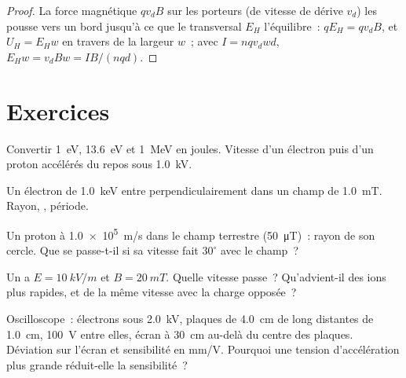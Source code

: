 \begin{proof}
La force magnétique $qv_dB$ sur les porteurs (de vitesse de dérive
$v_d$) les pousse vers un bord jusqu'à ce que le 
transversal $E_H$ l'équilibre~: $qE_H = qv_dB$, et $U_H = E_Hw$ en
travers de la largeur $w$~; avec $I = nqv_dwd$, $E_Hw = v_dBw = IB/(nqd)$.
\end{proof}

\section{Exercices}

\begin{exercise}[$\star$]\label{exo:b1:charged-particles:1}
Convertir \qty{1}{eV}, \qty{13.6}{eV} et \qty{1}{MeV} en joules. Vitesse
d'un électron puis d'un proton accélérés du repos sous \qty{1.0}{kV}.
\end{exercise}

\begin{exercise}[$\star$]\label{exo:b1:charged-particles:2}
Un électron de \qty{1.0}{keV} entre perpendiculairement dans un champ de
\qty{1.0}{mT}. Rayon, , période.
\end{exercise}

\begin{exercise}[$\star$]\label{exo:b1:charged-particles:3}
Un proton à \qty{1.0e5}{m/s} dans le champ terrestre (\qty{50}{\micro T})~:
rayon de son cercle. Que se passe-t-il si sa vitesse fait $30^\circ$ avec
le champ~?
\end{exercise}

\begin{exercise}[$\star$]\label{exo:b1:charged-particles:4}
Un  a $E = \qty{10}{kV/m}$ et $B = \qty{20}{mT}$.
Quelle vitesse passe~? Qu'advient-il des ions plus rapides, et de la même
vitesse avec la charge opposée~?
\end{exercise}

\begin{exercise}[$\star\star$]\label{exo:b1:charged-particles:5}
Oscilloscope~: électrons sous \qty{2.0}{kV}, plaques de \qty{4.0}{cm} de
long distantes de \qty{1.0}{cm}, \qty{100}{V} entre elles, écran à
\qty{30}{cm} au-delà du centre des plaques. Déviation sur l'écran et
sensibilité en mm/V. Pourquoi une tension d'accélération plus grande
réduit-elle la sensibilité~?
\end{exercise}

